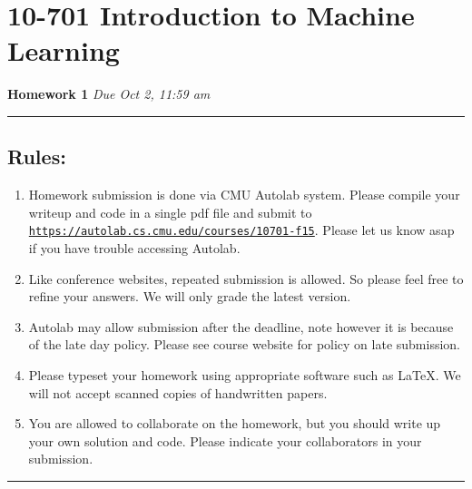 \documentclass{article}
\begin{document}
\section*{10-701 Introduction to Machine Learning}
{\large \bf Homework 1} \hfill {\it Due Oct 2, 11:59 am}

\noindent\rule{\textwidth}{1pt}

\vspace{5ex}
\subsection*{Rules:}
\vspace{2ex}

\begin{enumerate}
\item Homework submission is done via CMU Autolab system. 
Please compile your writeup and code in a single pdf file and submit to  {\tt \href{https://autolab.cs.cmu.edu/courses/10701-f15}{https://autolab.cs.cmu.edu/courses/10701-f15}}. 
Please let us know asap if you have trouble accessing Autolab.

\item Like conference websites, repeated submission is allowed. 
So please feel free to refine your answers. 
We will only grade the latest version.

\item Autolab may allow submission after the deadline, note however it is because of the late day policy. Please see course website for policy on late submission. 

\item Please typeset your homework using appropriate software such as \LaTeX. 
We will not accept scanned copies of handwritten papers. 


\item You are allowed to collaborate on the homework, but you should write up your own solution and code. Please indicate your collaborators in your submission.

\end{enumerate}

\vspace{7ex}

\noindent\rule{\textwidth}{1pt}
\newpage





%
\end{document}
